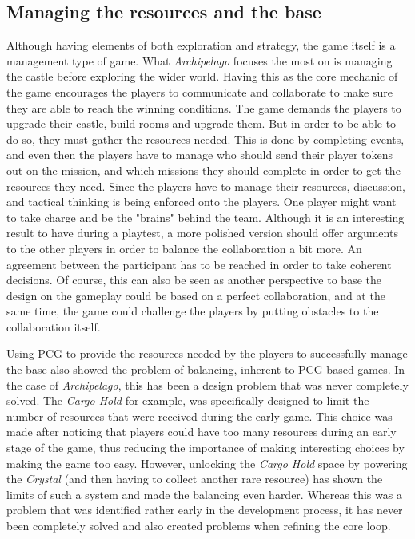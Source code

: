 \subsection{Managing the resources and the base}
\label{sec:management}
Although having elements of both exploration and strategy, the game itself is a management type of game. What \textit{Archipelago} focuses the most on is managing the castle before exploring the wider world. Having this as the core mechanic of the game encourages the players to communicate and collaborate to make sure they are able to reach the winning conditions. The game demands the players to upgrade their castle, build rooms and upgrade them. But in order to be able to do so, they must gather the resources needed. This is done by completing events, and even then the players have to manage who should send their player tokens out on the mission, and which missions they should complete in order to get the resources they need. Since the players have to manage their resources, discussion, and tactical thinking is being enforced onto the players. One player might want to take charge and be the "brains" behind the team. Although it is an interesting result to have during a playtest, a more polished version should offer arguments to the other players in order to balance the collaboration a bit more. An agreement between the participant has to be reached in order to take coherent decisions. Of course, this can also be seen as another perspective to base the design on the gameplay could be based on a perfect collaboration, and at the same time, the game could challenge the players by putting obstacles to the collaboration itself. 

Using PCG to provide the resources needed by the players to successfully manage the base also showed the problem of balancing, inherent to PCG-based games. In the case of \textit{Archipelago}, this has been a design problem that was never completely solved. The \textit{Cargo Hold} for example, was specifically designed to limit the number of resources that were received during the early game. This choice was made after noticing that players could have too many resources during an early stage of the game, thus reducing the importance of making interesting choices by making the game too easy. However, unlocking the \textit{Cargo Hold} space by powering the \textit{Crystal} (and then having to collect another rare resource) has shown the limits of such a system and made the balancing even harder. Whereas this was a problem that was identified rather early in the development process, it has never been completely solved and also created problems when refining the core loop.


